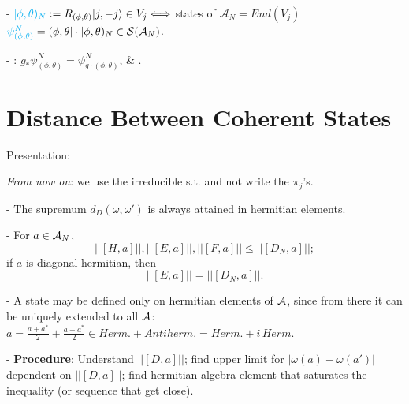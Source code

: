 
-  $\lbtext{|\phi, \theta)_N} := R_{(\phi, \theta)}|j, -j\rangle \in V_j \Longleftrightarrow $ states of $\mathcal A_N = End(V_j)$ $\lbtext{\psi^N_{(\phi, \theta)}} = (\phi, \theta| \cdot |\phi, \theta)_N \in \mathcal S(\mathcal A_N)$. 

- : $g_* \psi^N_{(\phi, \theta)} = \psi^N_{g\cdot (\phi, \theta)}$, \& .


\linea
\section{Distance Between Coherent States}

Presentation:

\textit{From now on}: we use the irreducible s.t. and not write the $\pi_j$'s.

- The supremum $d_D(\omega, \omega')$ is always attained in hermitian elements.

- For $a \in \mathcal A_N$, 
\begin{equation} \label{ineqDN}
    ||[H, a]||, ||[E, a]||, ||[F, a]||  \leq ||[D_N, a]||;
\end{equation} \label{eqDNdiag}
if $a$ is diagonal hermitian, then
\begin{equation}
    ||[E, a]|| = ||[D_N, a]||.
\end{equation}

- A state may be defined only on hermitian elements of $\mathcal A$, since from there it can be uniquely extended to all $\mathcal A$: $a = \frac{a+a^*}{2} + \frac{a - a^*}{2} \in Herm. + Antiherm. = Herm. + i\, Herm.$

\linea

- \textbf{Procedure}: Understand $||[D, a]||$; find upper limit for $|\omega(a) - \omega(a')|$ dependent on $||[D, a]||$; find hermitian algebra element that saturates the inequality (or sequence that get close). 

